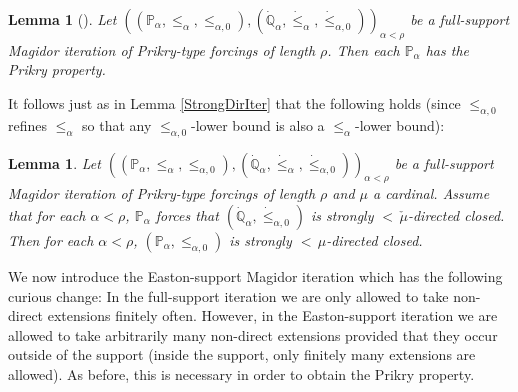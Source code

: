 \documentclass[a4paper]{amsart}
\theoremstyle{definition}
\theoremstyle{remark}
\theoremstyle{plain}
\newtheorem{mylem}[mydef]{Lemma}
\numberwithin{mydef}{section}
\newcommand{\dP}{\mathbb{P}}
\newcommand{\dQ}{\mathbb{Q}}
\begin{document}
	\begin{mylem}[{\cite[Lemma 6.2]{GitikHandbook}}]\label{PrikryIterFull}
		Let $((\dP_{\alpha},\leq_{\alpha},\leq_{\alpha,0}),(\dot{\dQ}_{\alpha},\dot{\leq}_{\alpha},\dot{\leq}_{\alpha,0}))_{\alpha<\rho}$ be a full-support Magidor iteration of Prikry-type forcings of length $\rho$. Then each $\dP_{\alpha}$ has the Prikry property.
	\end{mylem}
	
	It follows just as in Lemma \ref{StrongDirIter} that the following holds (since $\leq_{\alpha,0}$ refines $\leq_{\alpha}$ so that any $\leq_{\alpha,0}$-lower bound is also a $\leq_{\alpha}$-lower bound):
	
	\begin{mylem}\label{FullSupportClosure}
		Let $((\dP_{\alpha},\leq_{\alpha},\leq_{\alpha,0}),(\dot{\dQ}_{\alpha},\dot{\leq}_{\alpha},\dot{\leq}_{\alpha,0}))_{\alpha<\rho}$ be a full-support Magidor iteration of Prikry-type forcings of length $\rho$ and $\mu$ a cardinal. Assume that for each $\alpha<\rho$, $\dP_{\alpha}$ forces that $(\dot{\dQ}_{\alpha},\dot{\leq}_{\alpha,0})$ is strongly ${<}\,\check{\mu}$-directed closed. Then for each $\alpha<\rho$, $(\dP_{\alpha},\leq_{\alpha,0})$ is strongly ${<}\,\mu$-directed closed.
	\end{mylem}
	
	We now introduce the Easton-support Magidor iteration which has the following curious change: In the full-support iteration we are only allowed to take non-direct extensions finitely often. However, in the Easton-support iteration we are allowed to take arbitrarily many non-direct extensions provided that they occur outside of the support (inside the support, only finitely many extensions are allowed). As before, this is necessary in order to obtain the Prikry property.
	
\end{document}
